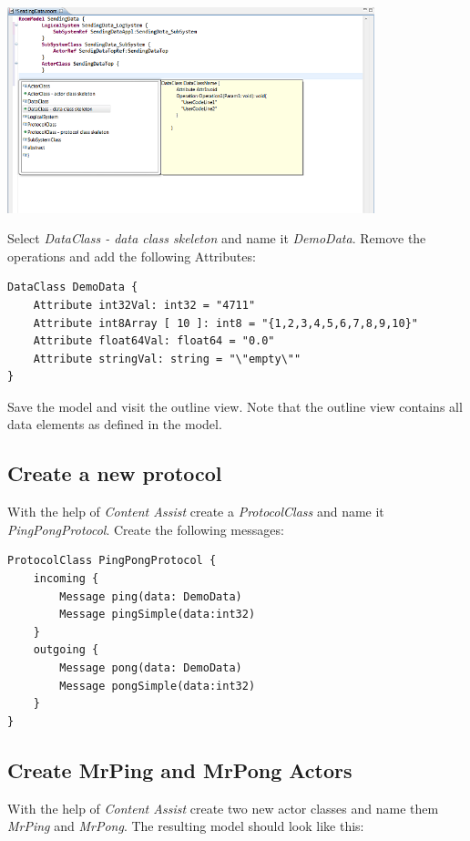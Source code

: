 \includegraphics[width=0.8\textwidth]{images/025-SendingData01.png}

Select \textit{DataClass - data class skeleton} and name it \textit{DemoData}.
Remove the operations and add the following Attributes:

\begin{verbatim}
DataClass DemoData {
    Attribute int32Val: int32 = "4711"
    Attribute int8Array [ 10 ]: int8 = "{1,2,3,4,5,6,7,8,9,10}"
    Attribute float64Val: float64 = "0.0"
    Attribute stringVal: string = "\"empty\""
}
\end{verbatim}

Save the model and visit the outline view.
Note that the outline view contains all data elements as defined in the model. 

\subsection{Create a new protocol}

With the help of \textit{Content Assist} create a \textit{ProtocolClass} and name it 
\textit{PingPongProtocol}. Create the following messages:

\begin{verbatim} 
ProtocolClass PingPongProtocol {
    incoming {
        Message ping(data: DemoData)
        Message pingSimple(data:int32)
    }
    outgoing {
        Message pong(data: DemoData)
        Message pongSimple(data:int32)
    }
}    
\end{verbatim}

\subsection{Create MrPing and MrPong Actors}

With the help of \textit{Content Assist} create two new actor classes and name them \textit{MrPing} and 
\textit{MrPong}. The resulting model should look like this:

